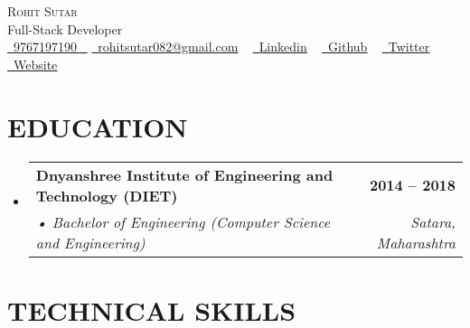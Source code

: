 \documentclass[letterpaper,11pt]{article}
\makeatletter
\newcommand{\resumeSubheading}[4]{
  \vspace{-2pt}\item
    \begin{tabular*}{1.0\textwidth}[t]{l@{\extracolsep{\fill}}r}
      \textbf{\large#1} & \textbf{\small #2} \\
      \textit{\large#3} & \textit{\small #4} \\
      
    \end{tabular*}\vspace{-7pt}
}
\newcommand{\resumeSubHeadingListStart}{\begin{itemize}[leftmargin=0.0in, label={}]}
\newcommand{\resumeSubHeadingListEnd}{\end{itemize}}
\makeatother
\begin{document}
\begin{center}
    {\Huge \scshape Rohit Sutar} \\ \vspace{2pt}
    \large Full-Stack Developer \\ \vspace{2pt}
    \small \href{tel:9767197190}{ \raisebox{-0.1\height}\faPhone\ \underline{9767197190} ~} \href{mailto:rohitsutar082@gmail.com}{\raisebox{-0.2\height}\faEnvelope\  \underline{rohitsutar082@gmail.com}} ~ 
    \href{https://www.linkedin.com/in/rohit-sutar-89687a1b6}{\raisebox{-0.2\height}\faLinkedinSquare\ \underline{Linkedin}}  ~
    \href{https://github.com/sutarrohit}{\raisebox{-0.2\height}\faGithub\ \underline{Github}} ~
    \href{https://twitter.com/imSrohitS}{\raisebox{-0.2\height}\faTwitter\ \underline{Twitter}} ~
     \href{https://developer-profile-gamma.vercel.app}{\raisebox{-0.2\height}\faExternalLink\ \underline{Website}} ~

\end{center}
 \vspace{-3mm}



 
\section{EDUCATION}
 \vspace{-1pt}
  \resumeSubHeadingListStart
    \resumeSubheading
      {Dnyanshree Institute of Engineering and Technology (DIET)}{2014 – 2018}
      {•	Bachelor of Engineering (Computer Science and Engineering) }{Satara, Maharashtra}
 \vspace{-3pt}
  \resumeSubHeadingListEnd
  

\section{TECHNICAL SKILLS}
\vspace{2pt}
\end{document}
